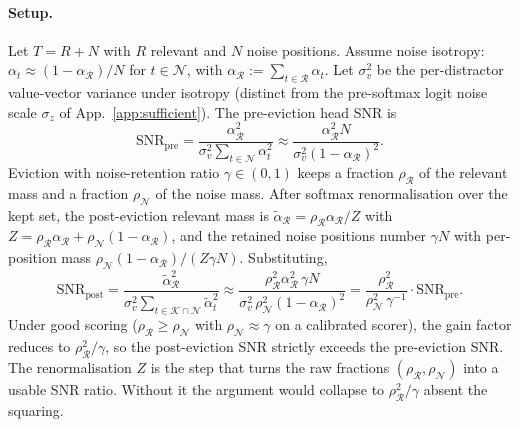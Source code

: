 \paragraph{Setup.} Let $T = R + N$ with $R$ relevant and $N$ noise positions.
Assume noise isotropy: $\alpha_t \approx (1 - \alpha_{\mathcal{R}}) / N$ for
$t \in \mathcal{N}$, with $\alpha_{\mathcal{R}} := \sum_{t \in \mathcal{R}} \alpha_t$.
Let $\sigma_v^2$ be the per-distractor value-vector variance under isotropy
(distinct from the pre-softmax logit noise scale $\sigma_z$ of
App.~\ref{app:sufficient}). The pre-eviction head SNR is
\[
\mathrm{SNR}_{\mathrm{pre}} = \frac{\alpha_{\mathcal{R}}^2}
{\sigma_v^2 \sum_{t \in \mathcal{N}} \alpha_t^2}
\approx \frac{\alpha_{\mathcal{R}}^2 N}{\sigma_v^2 (1 - \alpha_{\mathcal{R}})^2}.
\]
Eviction with noise-retention ratio $\gamma \in (0, 1)$ keeps a fraction
$\rho_{\mathcal{R}}$ of the relevant mass and a fraction $\rho_{\mathcal{N}}$
of the noise mass. After softmax renormalisation over the kept set, the
post-eviction relevant mass is
$\widetilde{\alpha}_{\mathcal{R}} = \rho_{\mathcal{R}} \alpha_{\mathcal{R}} / Z$
with $Z = \rho_{\mathcal{R}} \alpha_{\mathcal{R}} + \rho_{\mathcal{N}}
(1 - \alpha_{\mathcal{R}})$, and the retained noise positions number
$\gamma N$ with per-position mass $\rho_{\mathcal{N}}(1-\alpha_{\mathcal{R}})/(Z
\gamma N)$. Substituting,
\begin{equation}
\label{eq:scaling-app}
\mathrm{SNR}_{\mathrm{post}}
= \frac{\widetilde{\alpha}_{\mathcal{R}}^2}
{\sigma_v^2 \sum_{t \in \mathcal{K} \cap \mathcal{N}} \widetilde{\alpha}_t^2}
\approx \frac{\rho_{\mathcal{R}}^2 \alpha_{\mathcal{R}}^2 \, \gamma N}
{\sigma_v^2 \, \rho_{\mathcal{N}}^2 (1 - \alpha_{\mathcal{R}})^2}
= \frac{\rho_{\mathcal{R}}^2}{\rho_{\mathcal{N}}^2 \, \gamma^{-1}} \cdot
\mathrm{SNR}_{\mathrm{pre}}.
\end{equation}
Under good scoring ($\rho_{\mathcal{R}} \ge \rho_{\mathcal{N}}$ with
$\rho_{\mathcal{N}} \approx \gamma$ on a calibrated scorer), the gain factor
reduces to $\rho_{\mathcal{R}}^2 / \gamma$, so the post-eviction SNR strictly
exceeds the pre-eviction SNR. The renormalisation $Z$ is the step that turns
the raw fractions $(\rho_{\mathcal{R}}, \rho_{\mathcal{N}})$ into a usable
SNR ratio. Without it the argument would collapse to $\rho_{\mathcal{R}}^2/\gamma$
absent the squaring.


